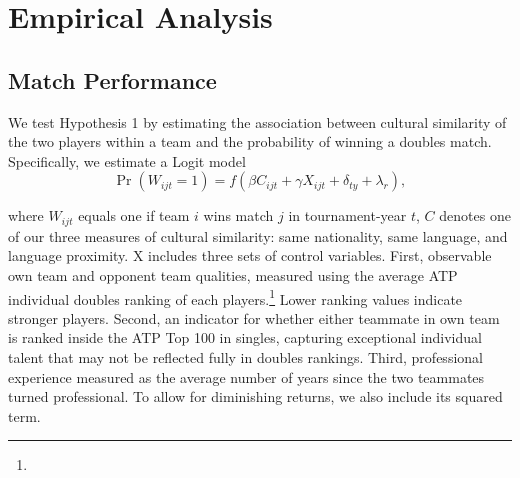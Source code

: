 \documentclass[10pt]{article}
\begin{document}
\section{Empirical Analysis}

\subsection{Match Performance}
We test Hypothesis 1 by  estimating the association between cultural similarity of the two players within a team and the probability of winning a doubles match. Specifically, we estimate a Logit model
\begin{equation}\label{matchoutcome}
  \operatorname{Pr}(W_{ijt} = 1) = f(\beta C_{ijt} + \gamma X_{ijt} + \delta_{ty} + \lambda_r) , 
\end{equation}


where $W_{ijt}$ equals one if team $i$ wins match $j$ in tournament-year $t$, $C$ denotes one of our three measures of cultural similarity: same nationality, same language, and language proximity. 
X includes three sets of control variables. First, observable own team and opponent team qualities, measured using the average ATP individual doubles ranking of each  players.\footnote{} Lower ranking values indicate stronger players. Second, an indicator for whether either teammate in own team is ranked inside the ATP Top 100 in singles, capturing exceptional individual talent that may not be reflected fully in doubles rankings. Third, professional experience measured as the average number of years since the two teammates turned professional. To allow for diminishing returns, we also include its squared term. 
\end{document}
